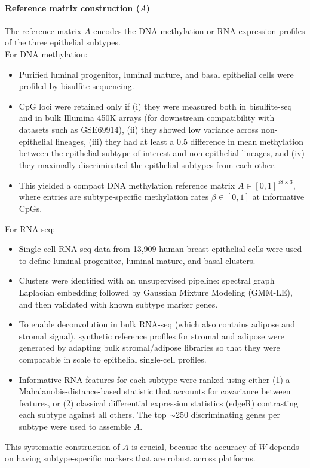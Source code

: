 \documentclass[10pt]{extarticle}
\begin{document}
\paragraph{Reference matrix construction ($A$)}
The reference matrix $A$ encodes the DNA methylation or RNA expression profiles of the three epithelial subtypes.\\
For DNA methylation:
\begin{itemize}[label=-]
    \item Purified luminal progenitor, luminal mature, and basal epithelial cells were profiled by bisulfite sequencing.
    \item CpG loci were retained only if (i) they were measured both in bisulfite-seq and in bulk Illumina 450K arrays (for downstream compatibility with datasets such as GSE69914), (ii) they showed low variance across non-epithelial lineages, (iii) they had at least a 0.5 difference in mean methylation between the epithelial subtype of interest and non-epithelial lineages, and (iv) they maximally discriminated the epithelial subtypes from each other.
    \item This yielded a compact DNA methylation reference matrix $A \in [0,1]^{58 \times 3}$, where entries are subtype-specific methylation rates $\beta \in [0,1]$ at informative CpGs.
\end{itemize}
For RNA-seq:
\begin{itemize}[label=-]
    \item Single-cell RNA-seq data from 13{,}909 human breast epithelial cells were used to define luminal progenitor, luminal mature, and basal clusters.
    \item Clusters were identified with an unsupervised pipeline: spectral graph Laplacian embedding followed by Gaussian Mixture Modeling (GMM-LE), and then validated with known subtype marker genes.
    \item To enable deconvolution in bulk RNA-seq (which also contains adipose and stromal signal), synthetic reference profiles for stromal and adipose were generated by adapting bulk stromal/adipose libraries so that they were comparable in scale to epithelial single-cell profiles.
    \item Informative RNA features for each subtype were ranked using either (1) a Mahalanobis-distance-based statistic that accounts for covariance between features, or (2) classical differential expression statistics (edgeR) contrasting each subtype against all others. The top $\sim$250 discriminating genes per subtype were used to assemble $A$.
\end{itemize}
This systematic construction of $A$ is crucial, because the accuracy of $W$ depends on having subtype-specific markers that are robust across platforms.
\end{document}

